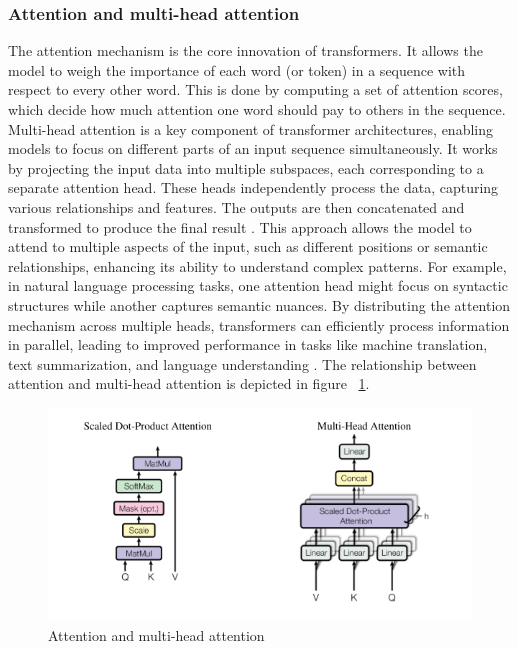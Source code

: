 \documentclass[licencjacka,en]{pracamgr}
\begin{document}
\subsubsection{Attention and multi-head attention}
The attention mechanism is the core innovation of transformers. It allows the model to weigh the importance of each word (or token) in a sequence with respect to every other word. This is done by computing a set of attention scores, which decide how much attention one word should pay to others in the sequence.
Multi-head attention is a key component of transformer architectures, enabling models to focus on different parts of an input sequence simultaneously. It works by projecting the input data into multiple subspaces, each corresponding to a separate attention head. These heads independently process the data, capturing various relationships and features. The outputs are then concatenated and transformed to produce the final result \cite{attention}.
This approach allows the model to attend to multiple aspects of the input, such as different positions or semantic relationships, enhancing its ability to understand complex patterns. For example, in natural language processing tasks, one attention head might focus on syntactic structures while another captures semantic nuances. 
By distributing the attention mechanism across multiple heads, transformers can efficiently process information in parallel, leading to improved performance in tasks like machine translation, text summarization, and language understanding \cite{medium_medium_t}. 
The relationship between attention and multi-head attention is depicted in figure ~\ref{fig:attention_fig}.

\begin{figure}
    \centering
    \includegraphics[width=0.7\linewidth]{bachelor_images/attention_fig.png}
    \caption{Attention and multi-head attention \cite{attention}}
    \label{fig:attention_fig}
\end{figure}
\end{document}
